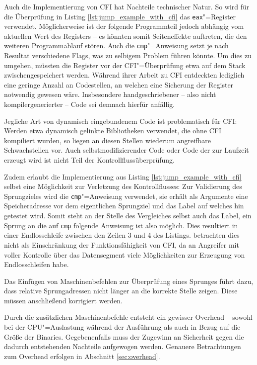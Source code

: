 Auch die Implementierung von CFI hat Nachteile technischer Natur. So wird für die Überprüfung in Listing \ref{lst:jump_example_with_cfi} das \texttt{eax}"=Register verwendet. Möglicherweise ist der folgende Programmteil jedoch abhängig vom aktuellen Wert des Registers -- es könnten somit Seiteneffekte auftreten, die den weiteren Programmablauf stören. Auch die \texttt{cmp}"=Anweisung setzt je nach Resultat verschiedene Flags, was zu selbigem Problem führen könnte. Um dies zu umgehen, müssten die Register vor der CFI"=Überprüfung etwa auf dem Stack zwischengespeichert werden. Während ihrer Arbeit zu CFI entdeckten \cite{Abadi.2009} lediglich eine geringe Anzahl an Codestellen, an welchen eine Sicherung der Register notwendig gewesen wäre. Insbesondere handgeschriebener -- also nicht kompilergenerierter -- Code sei demnach hierfür anfällig.

Jegliche Art von dynamisch eingebundenem Code ist problematisch für CFI: Werden etwa dynamisch gelinkte Bibliotheken verwendet, die ohne CFI kompiliert wurden, so liegen an diesen Stellen wiederum angreifbare Schwachstellen vor. Auch selbstmodifizierender Code oder Code der zur Laufzeit erzeugt wird ist nicht Teil der Kontrollflussüberprüfung.


Zudem erlaubt die Implementierung aus Listing \ref{lst:jump_example_with_cfi} selbst eine Möglichkeit zur Verletzung des Kontrollflusses: Zur Validierung des Sprungzieles wird die \texttt{cmp}"=Anweisung verwendet, sie erhält als Argumente eine Speicheradresse vor dem eigentlichen Sprungziel und das Label auf welches hin getestet wird. Somit steht an der Stelle des Vergleiches selbst auch das Label, ein Sprung an die auf \texttt{cmp} folgende Anweisung ist also möglich. Dies resultiert in einer Endlosschleife zwischen den Zeilen 3 und 4 des Listings. \cite{Abadi.2009} betrachten dies nicht als Einschränkung der Funktionsfähigkeit von CFI, da an Angreifer mit voller Kontrolle über das Datensegment viele Möglichkeiten zur Erzeugung von Endlosschleifen habe.

Das Einfügen von Maschinenbefehlen zur Überprüfung eines Sprunges führt dazu, dass relative Sprungadressen nicht länger an die korrekte Stelle zeigen. Diese müssen anschließend korrigiert werden.

Durch die zusätzlichen Maschinenbefehle entsteht ein gewisser Overhead -- sowohl bei der CPU"=Auslastung während der Ausführung als auch in Bezug auf die Größe der Binaries. Gegebenenfalls muss der Zugewinn an Sicherheit gegen die dadurch entstehenden Nachteile aufgewogen werden. Genauere Betrachtungen zum Overhead erfolgen in Abschnitt \ref{sec:overhead}.

